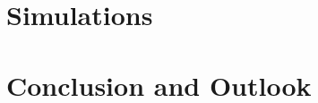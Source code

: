 \documentclass[%
    draft, %
    11pt,
    a4paper
]
{memoir}
\begin{document}
\chapter{Simulations}
\label{sec:MissionScenarios}


\chapter{Conclusion and Outlook}
\label{sec:ConclusionAndOutlook}








\end{document}
